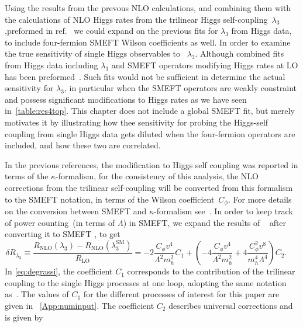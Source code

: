 \par Using the results from the prevous NLO calculations, and combining them with the calculations of NLO Higgs rates from the trilinear Higgs self-coupling~$\lambda_3$,preformed in ref.~\cite{Gorbahn:2016uoy, Degrassi:2016wml, Bizon:2016wgr, Maltoni:2017ims, Degrassi:2021uik}  we could expand on the previous fits for $\lambda_3$ from Higgs data, to include four-fermion SMEFT Wilson coefficients as well. In order to examine the true sensitivity of single Higgs observables to ~$\lambda_3$.  
Although combined fits from Higgs data including $\lambda_3$ and SMEFT operators modifying Higgs rates at LO has been preformed~\cite{DiVita:2017eyz}. Such fits would not be sufficient in determine the actual sensitivity for $\lambda_3$, in particular when the SMEFT operators are weakly constraint and possess significant modifications to Higgs rates as we have seen in~\autoref{table:res4top}. This chapter does not include a global SMEFT fit, but merely motivates it by illustrating how thee sensitivity for probing the Higgs-self coupling from single Higgs data gets diluted when the four-fermion operators are included, and how these two are correlated. 
%
\par In the previous references, the modification to Higgs self coupling was reported in terms of the $\kappa$-formalism, for the consistency of this analysis, the NLO corrections from the trilinear self-coupling will be converted from this formalism to the SMEFT notation, in terms of the Wilson coefficient~$C_\phi$. For more details on the conversion between SMEFT and $\kappa$-formalism see~. In order to keep track of power counting~(in terms of $\Lambda$) in SMEFT, we expand the results of ~\cite{Degrassi:2016wml} after converting it to SMEFT , to get
\begin{equation}
	\delta R_{\lambda_3}\equiv\frac{R_\mathrm{ NLO}(\lambda_3)-R_\mathrm{ NLO}(\lambda_3^\mathrm{{SM}})}{R_\mathrm{ LO}}=-2\frac{C_{\phi}v^4}{\Lambda^2 m_h^2}C_1 + \left(-4\frac{C_{\phi}v^4}{\Lambda^2 m_h^2}+4\frac{C_{\phi}^2 v^8}{m_h^4\Lambda^4}\right) C_2 . \;\;\;\;\;
	\label{eq:degrassi}
\end{equation}
%
In \eqref{eq:degrassi}, the coefficient $C_1$ corresponds to the contribution of the trilinear coupling to the single Higgs processes at one loop, adopting the same notation as~\cite{Degrassi:2016wml}. The values of $C_1$ for the different processes of interest for this paper are given in ~\autoref{App:numinput}. The coefficient $C_2$ describes universal corrections and is given by
